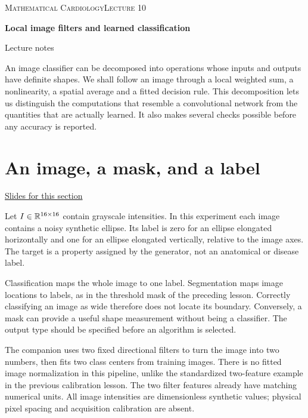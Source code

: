 \documentclass[11pt,letterpaper]{article}
\theoremstyle{definition}\newtheorem{definition}{Definition}\newtheorem{example}{Example}
\numberwithin{equation}{section}
\begin{document}
{\small\scshape Mathematical Cardiology\hfill Lecture 10}\par\medskip
{\raggedright{}\LARGE\bfseries\color{ink} Local image filters and learned classification\par}\medskip
{\small Lecture notes}\par\bigskip
An image classifier can be decomposed into operations whose inputs and outputs have definite shapes. We shall follow an image through a local weighted sum, a nonlinearity, a spatial average and a fitted decision rule. This decomposition lets us distinguish the computations that resemble a convolutional network from the quantities that are actually learned. It also makes several checks possible before any accuracy is reported.

\section{An image, a mask, and a label}
\hypertarget{note-an-image-a-mask-and-a-label}{}\label{note:an-image-a-mask-and-a-label}
{\small \href{slides.html\#frame=specify-the-output\&step=1}{Slides for this section}}\par
Let $I\in\mathbb{R}^{16\times16}$ contain grayscale intensities. In this experiment each image contains a noisy synthetic ellipse. Its label is zero for an ellipse elongated horizontally and one for an ellipse elongated vertically, relative to the image axes. The target is a property assigned by the generator, not an anatomical or disease label.

Classification maps the whole image to one label. Segmentation maps image locations to labels, as in the threshold mask of the preceding lesson. Correctly classifying an image as wide therefore does not locate its boundary. Conversely, a mask can provide a useful shape measurement without being a classifier. The output type should be specified before an algorithm is selected.

The companion uses two fixed directional filters to turn the image into two numbers, then fits two class centers from training images. There is no fitted image normalization in this pipeline, unlike the standardized two-feature example in the previous calibration lesson. The two filter features already have matching numerical units. All image intensities are dimensionless synthetic values; physical pixel spacing and acquisition calibration are absent.
\end{document}
